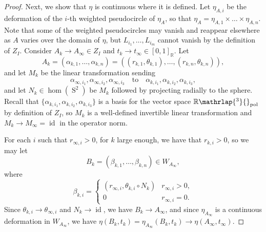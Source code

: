 \documentclass[JEP,XML,SOM,Unicode,NoFloatCountersInSection,published]{cedram}
\theoremstyle{remark}
\let\mb\mathbb
\DeclareMathOperator{\sphere}{S}
\newcommand{\Rpol}[1]{\mb{R}\mathrlap{{}^{#1}}{}_\text{pol}}
\DeclareMathOperator{\id}{id}
\begin{document}
\begin{proof}
Next, we show that $\eta$ is continuous where it is defined.
Let $\eta_{A,i}$ be the deformation of the $i$-th weighted pseudocircle of $\eta_A$, so that
$\eta_A = {\eta_{A,1} \times \dots \times \eta_{A,n}}$.
Note that some of the weighted pseudocircles may vanish and reappear elsewhere as $A$ varies over the domain of $\eta$, but $L_{i_1},\dots,L_{i_m}$ cannot vanish by the definition of $Z_I$.
Consider $A_k \to A_\infty \in Z_I$ and $t_k \to t_\infty \in [0,1]_\mb{R}$. Let
\[ A_k = (\alpha_{k,1},\dots,\alpha_{k,n}) = ((r_{k,1},\theta_{k,1}),\dots,(r_{k,n},\theta_{k,n})), \]
and let $M_k$ be the linear transformation sending
\[
\alpha_{\infty,i_1},\alpha_{\infty,i_2},\alpha_{\infty,i_3}\quad\text{to}\quad \alpha_{k,i_1},\alpha_{k,i_2},\alpha_{k,i_3},
\]
and let $N_k \in \hom(\sphere^2)$ be $M_k$ followed by projecting radially to the sphere.
Recall that $\{\alpha_{k,i_1},\alpha_{k,i_2},\alpha_{k,i_3}\}$ is a basis for the vector space $\Rpol{3}$ by definition of $Z_I$, so $M_k$ is a well-defined invertible linear transformation and $M_k \to M_\infty=\id$ in the operator norm.

For each $i$ such that $r_{\infty,i} > 0$, for $k$ large enough, we have that $r_{k,i} > 0$, so we may let
\[ B_k = (\beta_{k,1},\dots,\beta_{k,n}) \in W_{A_\infty}, \]
where
\[ \beta_{k,i} = \begin{cases}
(r_{\infty,i},\theta_{k,i} \circ N_k) & r_{\infty,i} > 0, \\
0 & r_{\infty,i} = 0.
\end{cases}\]
Since $\theta_{k,i} \to \theta_{\infty,i}$ and $N_k \to \id$, we have $B_k \to A_\infty$, and since $\eta_{A_\infty}$ is a continuous deformation in $W_{A_\infty}$, we have $\eta(B_k,t_k) = \eta_{A_\infty}(B_k,t_k) \to \eta(A_\infty,t_\infty)$.


\end{proof}
\end{document}
